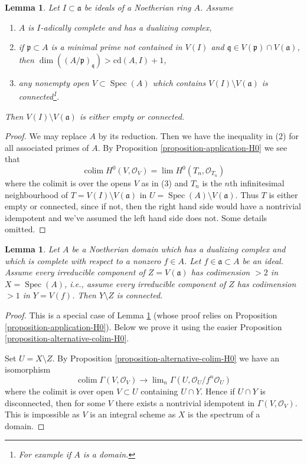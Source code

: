 \documentclass{stacks-project}
\theoremstyle{plain}
\newtheorem{lemma}[subsection]{Lemma}
\theoremstyle{definition}
\theoremstyle{remark}
\numberwithin{equation}{subsection}
\def\lim{\mathop{\mathrm{lim}}\nolimits}
\def\colim{\mathop{\mathrm{colim}}\nolimits}
\def\Spec{\mathop{\mathrm{Spec}}}
\begin{document}
\begin{lemma}
\label{lemma-connected}
Let $I \subset \mathfrak a$ be ideals of a Noetherian ring $A$.
Assume
\begin{enumerate}
\item $A$ is $I$-adically complete and has a dualizing complex,
\item if $\mathfrak p \subset A$ is a minimal prime not contained
in $V(I)$ and $\mathfrak q \in V(\mathfrak p) \cap V(\mathfrak a)$, then
$\dim((A/\mathfrak p)_\mathfrak q) > \text{cd}(A, I) + 1$,
\item any nonempty open $V \subset \Spec(A)$ which contains
$V(I) \setminus V(\mathfrak a)$ is connected\footnote{For example
if $A$ is a domain.}.
\end{enumerate}
Then $V(I) \setminus V(\mathfrak a)$ is either empty or connected.
\end{lemma}

\begin{proof}
We may replace $A$ by its reduction. Then we have the inequality
in (2) for all associated primes of $A$. By
Proposition \ref{proposition-application-H0} we see that
$$
\colim H^0(V, \mathcal{O}_V) = \lim H^0(T_n, \mathcal{O}_{T_n})
$$
where the colimit is over the opens $V$ as in (3) and $T_n$ is the
$n$th infinitesimal neighbourhood of $T = V(I) \setminus V(\mathfrak a)$
in $U = \Spec(A) \setminus V(\mathfrak a)$. Thus $T$ is either empty
or connected, since if not, then the right hand side would have a
nontrivial idempotent and we've assumed the left hand side does not.
Some details omitted.
\end{proof}

\begin{lemma}
\label{lemma-H0}
Let $A$ be a Noetherian domain which has a dualizing complex
and which is complete with respect to a nonzero $f \in A$.
Let $f \in \mathfrak a \subset A$ be an ideal.
Assume every irreducible component of $Z = V(\mathfrak a)$
has codimension $> 2$ in $X = \Spec(A)$, i.e., assume every
irreducible component of $Z$ has codimension $> 1$ in $Y = V(f)$.
Then $Y \setminus Z$ is connected.
\end{lemma}

\begin{proof}
This is a special case of Lemma \ref{lemma-connected} (whose proof
relies on Proposition \ref{proposition-application-H0}). Below we
prove it using the easier Proposition \ref{proposition-alternative-colim-H0}.

\medskip\noindent
Set $U = X \setminus Z$. By Proposition \ref{proposition-alternative-colim-H0}
we have an isomorphism
$$
\colim \Gamma(V, \mathcal{O}_V) \to
\lim_n \Gamma(U, \mathcal{O}_U/f^n \mathcal{O}_U)
$$
where the colimit is over open $V \subset U$ containing $U \cap Y$.
Hence if $U \cap Y$ is disconnected, then for some $V$ there exists
a nontrivial idempotent in $\Gamma(V, \mathcal{O}_V)$. This is impossible
as $V$ is an integral scheme as $X$ is the spectrum of a domain.
\end{proof}
\end{document}
